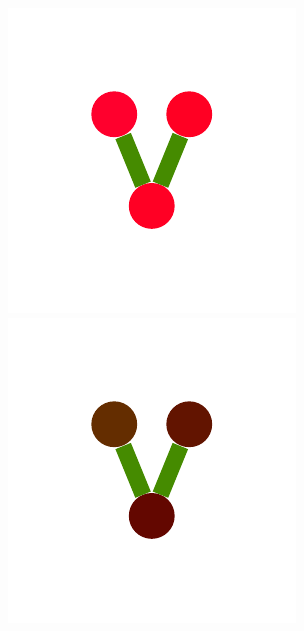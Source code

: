 \documentclass[a4paper,10pt]{article}
\begin{document}
\begin{figure}
{    \includegraphics[scale=.16]{./figures/6-5-tree-induced-15.pdf}
    \includegraphics[scale=.16]{./figures/6-5-tree-induced-16.pdf}
}
\end{figure}
\end{document}
